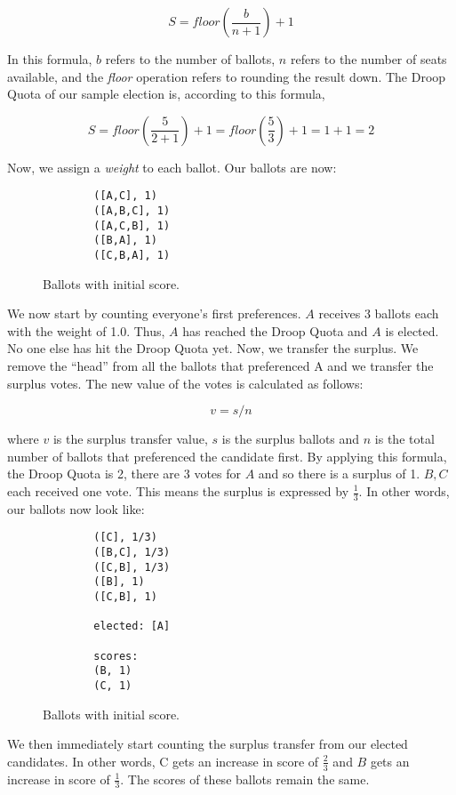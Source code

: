 $$
S = floor(\frac{b}{n + 1}) + 1
$$

In this formula, $b$ refers to the number of ballots, $n$ refers to the number
of seats available, and the \textit{floor} operation refers to rounding the
result down. The Droop Quota of our sample election is, according to this formula, 

$$
S = floor(\frac{5}{2 + 1}) + 1 = floor(\frac{5}{3}) + 1 = 1 + 1 = 2
$$

Now, we assign a \textit{weight} to each ballot. Our ballots are now: 

\begin{figure}[ht!!!!!!!!]
    \caption{Ballots with initial score.}
    \label{sample_election2}
    \begin{lstlisting}
        ([A,C], 1)
        ([A,B,C], 1)
        ([A,C,B], 1)
        ([B,A], 1)
        ([C,B,A], 1)
    \end{lstlisting}
\end{figure}

We now start by counting everyone's first preferences. $A$ receives 3 ballots
each with the weight of 1.0. Thus, $A$ has reached the Droop Quota and $A$ is
elected. No one else has hit the Droop Quota yet. Now, we transfer the surplus.
We remove the ``head'' from all the ballots that preferenced A and we transfer
the surplus votes. The new value of the votes is calculated as follows: 

$$
v = s/n
$$

where $v$ is the surplus transfer value, $s$ is the surplus ballots and $n$ is
the total number of ballots that preferenced the candidate first. By applying
this formula, the Droop Quota is 2, there are 3 votes for $A$ and so there is a
surplus of 1. $B, C$ each received one vote. This means the surplus is expressed
by $\frac{1}{3}$. In other words, our ballots now look like: 

\begin{figure}[ht!!!!!!!!]
    \caption{Ballots with initial score.}
    \label{sample_election2}
    \begin{lstlisting}
        ([C], 1/3)
        ([B,C], 1/3)
        ([C,B], 1/3)
        ([B], 1)
        ([C,B], 1)

        elected: [A]

        scores: 
        (B, 1)
        (C, 1)
    \end{lstlisting}
\end{figure}

We then immediately start counting the surplus transfer from our elected candidates. In other words, C gets an increase in score of $\frac{2}{3}$ and $B$ gets an increase in score of $\frac{1}{3}$. The scores of these ballots remain the same. 


